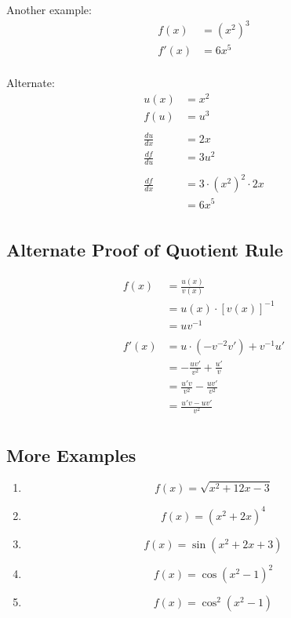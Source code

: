 \documentclass[letterpaper, landscape]{exam}
\begin{document}
  Another example:
  \begin{align*}
    f(x)  & = \left( x^2 \right)^3 \\
    f'(x) & = 6x^5 \\
  \end{align*}

  Alternate:
  \begin{align*}
    u(x)          & = x^2 \\
    f(u)          & = u^3 \\
    \\
    \frac{du}{dx} & = 2x \\
    \frac{df}{du} & = 3u^2 \\
    \\
    \frac{df}{dx} & = 3 \cdot \left( x^2 \right)^2 \cdot 2x \\
                  & = 6x^5 \\
  \end{align*}

  \subsection{Alternate Proof of Quotient Rule} %
  
  \begin{align*}
    f(x)  & = \frac{u(x)}{v(x)} \\
          & = u(x) \cdot [ v(x) ]^{-1} \\
          & = uv^{-1} \\
    \\
    f'(x) & = u \cdot (- v^{-2} v') + v^{-1} u' \\
          & = - \frac{uv'}{v^2} + \frac{u'}{v} \\
          & = \frac{u'v}{v^2} - \frac{uv'}{v^2} \\
          & = \frac{u'v - uv'}{v^2} \\
  \end{align*}

  \subsection{More Examples} %
  
  \begin{enumerate}

    \item 
      \[
        f(x) = \sqrt{x^2 + 12x - 3}
      \]

    \item 
      \[
        f(x) = \left( x^2 + 2x \right)^4
      \]

    \item 
      \[
        f(x) = \sin \left( x^2 + 2x + 3 \right)
      \]

    \item 
      \[
        f(x) = \cos \left( x^2 - 1 \right)^2
      \]

    \item 
      \[
        f(x) = \cos^2 \left( x^2 - 1 \right)
      \]

  \end{enumerate}
\end{document}
